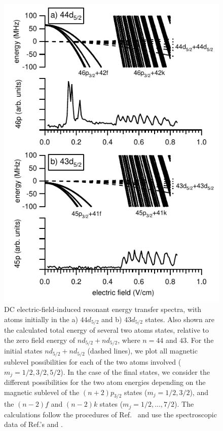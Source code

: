\documentclass[letterpaper,twocolumn,showpacs,preprintnumbers,amsmath,amssymb,prl,nolongbibliography]{revtex4-2}
\begin{document}
\begin{figure}
\includegraphics{fig2.pdf}
\caption{\label{fg:ret}
DC electric-field-induced resonant energy transfer spectra, with
atoms initially
in the a) $44d_{5/2}$ and b) $43d_{5/2}$ states.
Also shown are the calculated total energy of several two atoms
states, relative to the zero field energy of
$nd_{5/2}+nd_{5/2}$, where $n=44$ and $43$.  For the initial
states $nd_{5/2}+nd_{5/2}$ (dashed lines), we plot all magnetic
sublevel possibilities for each of the two atoms
involved ($m_{j}=1/2,3/2,5/2$).  In the case of the final states,
we consider the different possibilities for the two atom energies
depending on the magnetic sublevel of the $(n+2)p_{3/2}$ states
($m_j=1/2,3/2$), and the $(n-2)f$ and $(n-2)k$ states
($m_j=1/2, ..., 7/2$).  The calculations follow the procedures of
Ref.~\cite{zimmerman:1979}
and use the spectroscopic data of Ref.'s \cite{li:2003}
and \cite{han:2006}.
}
\end{figure}
\end{document}
